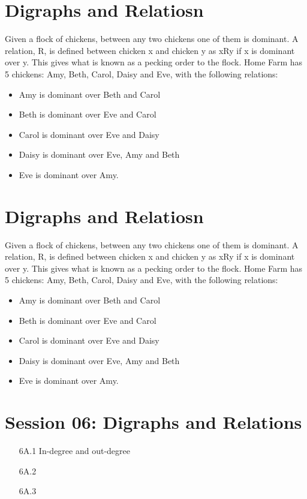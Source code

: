 \documentclass{article}
\begin{document}
\newpage

\newpage
\section{Digraphs and Relatiosn}
Given a flock of chickens, between any two chickens one of them is
dominant. A relation, R, is defined between chicken x and chicken y as xRy if x is
dominant over y. This gives what is known as a pecking order to the flock. Home
Farm has 5 chickens: Amy, Beth, Carol, Daisy and Eve, with the following relations:

\begin{itemize}
\item Amy is dominant over Beth and Carol
\item Beth is dominant over Eve and Carol
\item Carol is dominant over Eve and Daisy
\item Daisy is dominant over Eve, Amy and Beth
\item Eve is dominant over Amy.
\end{itemize}


\section{Digraphs and Relatiosn}
Given a flock of chickens, between any two chickens one of them is
dominant. A relation, R, is defined between chicken x and chicken y as xRy if x is
dominant over y. This gives what is known as a pecking order to the flock. Home
Farm has 5 chickens: Amy, Beth, Carol, Daisy and Eve, with the following relations:

\begin{itemize}
\item Amy is dominant over Beth and Carol
\item Beth is dominant over Eve and Carol
\item Carol is dominant over Eve and Daisy
\item Daisy is dominant over Eve, Amy and Beth
\item Eve is dominant over Amy.
\end{itemize}

\newpage
\section*{Session 06: Digraphs and Relations}
\begin{itemize}
\item[6A.1] In-degree and out-degree
\item[6A.2]
\item[6A.3]
\end{itemize}
\end{document}
